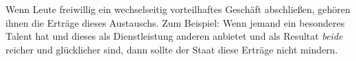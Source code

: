 Wenn Leute freiwillig ein wechselseitig vorteilhaftes Geschäft abschließen, gehören ihnen die Erträge dieses Austauschs.
Zum Beispiel: Wenn jemand ein besonderes Talent hat und dieses als Dienstleistung anderen anbietet und als Resultat \emph{beide} reicher und glücklicher sind, dann sollte der Staat diese Erträge nicht mindern.